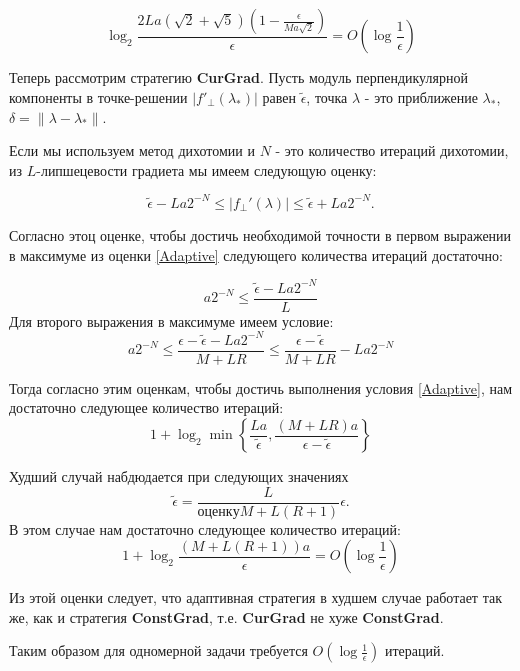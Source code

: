 \documentclass[12pt]{article}
\begin{document}
$$\log_2\frac{2La(\sqrt{2}+\sqrt{5})(1-\frac{\epsilon}{Ma\sqrt{2}})}{\epsilon} = O\left(\log \frac{1}{\epsilon}\right)$$

Теперь рассмотрим стратегию \textbf{CurGrad}. Пусть модуль перпендикулярной компоненты в точке-решении $|f'_\perp(\lambda_*)|$ равен $\tilde{\epsilon}$, точка $\lambda$ - это приближение $\lambda_*$, $\delta=\|\lambda-\lambda_*\|$.

Если мы используем метод дихотомии и $N$ - это количество итераций дихотомии, из $L$-липшецевости градиета мы имеем следующую оценку:

$$\tilde{\epsilon}-La2^{-N} \leq |f_\perp'(\lambda)|\leq \tilde{\epsilon}+La2^{-N}.$$

Согласно этоц оценке, чтобы достичь необходимой точности в первом выражении в максимуме из оценки \ref{Adaptive} следующего количества итераций достаточно:

$$a2^{-N} \leq \frac{\tilde{\epsilon}-La2^{-N}}{L}$$
Для второго выражения в максимуме имеем условие:
$$a2^{-N} \leq \frac{\epsilon - \tilde{\epsilon} - La2^{-N}}{M+LR}\leq \frac{\epsilon - \tilde{\epsilon}}{M+LR} - La2^{-N}$$

Тогда согласно этим оценкам, чтобы достичь выполнения условия \ref{Adaptive}, нам достаточно следующее количество итераций:
$$1+\log_2\min\left\{\frac{La}{\tilde{\epsilon}},\frac{(M+LR)a}{\epsilon-\tilde{\epsilon}}\right\}$$

Худший случай набдюдается при следующих значениях
$$\tilde{\epsilon} = \frac{L}{оценкуM+L(R+1)}\epsilon.$$
В этом случае нам достаточно следующее количество итераций:
$$1+\log_2\frac{(M+L(R+1))a}{\epsilon} = O\left(\log\frac{1}{\epsilon}\right)$$

Из этой оценки следует, что адаптивная стратегия в худшем случае работает так же, как и стратегия \textbf{ConstGrad}, т.е. \textbf{CurGrad} не хуже \textbf{ConstGrad}. 

Таким образом для одномерной задачи требуется $O\left(\log \frac{1}{\epsilon}\right)$ итераций.
\end{document}
